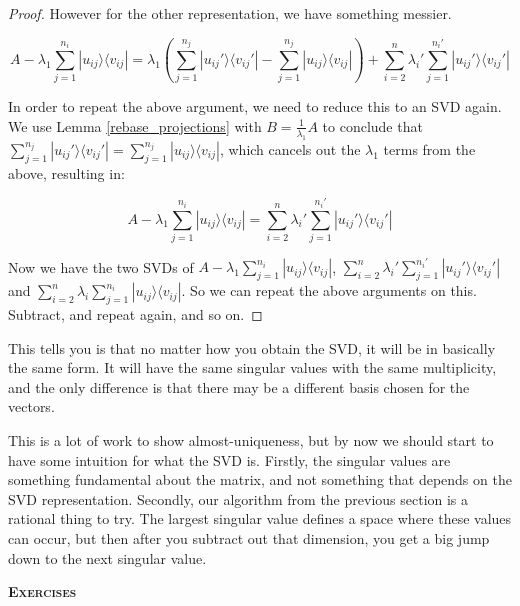 \documentclass{amsbook}
\begin{document}
\begin{proof}
However for the other representation, we have something messier.

$$
A-\lambda_1\sum_{j=1}^{n_i}|u_{ij}\rangle\langle v_{ij}|=\lambda_1\left(\sum_{j=1}^{n_j}|u_{ij}'\rangle\langle v_{ij}'|-\sum_{j=1}^{n_j}|u_{ij}\rangle\langle v_{ij}|\right)+\sum_{i=2}^n\lambda_i'\sum_{j=1}^{n_i'}|u_{ij}'\rangle\langle v_{ij}'|
$$

In order to repeat the above argument, we need to reduce this to an SVD again.  We use Lemma \ref{rebase_projections} with $B=\frac{1}{\lambda_1}A$ to conclude that $\sum_{j=1}^{n_j}|u_{ij}'\rangle\langle v_{ij}'|=\sum_{j=1}^{n_j}|u_{ij}\rangle\langle v_{ij}|$, which cancels out the $\lambda_1$ terms from the above, resulting in:

$$
A-\lambda_1\sum_{j=1}^{n_i}|u_{ij}\rangle\langle v_{ij}|=\sum_{i=2}^n\lambda_i'\sum_{j=1}^{n_i'}|u_{ij}'\rangle\langle v_{ij}'|
$$

Now we have the two SVDs of $A-\lambda_1\sum_{j=1}^{n_i}|u_{ij}\rangle\langle v_{ij}|$, $\sum_{i=2}^n\lambda_i'\sum_{j=1}^{n_i'}|u_{ij}'\rangle\langle v_{ij}'|$ and $\sum_{i=2}^n\lambda_i\sum_{j=1}^{n_i}|u_{ij}\rangle\langle v_{ij}|$.  So we can repeat the above arguments on this.  Subtract, and repeat again, and so on.

\end{proof}

This tells you is that no matter how you obtain the SVD, it will be in basically the same form.  It will have the same singular values with the same multiplicity, and the only difference is that there may be a different basis chosen for the vectors.

This is a lot of work to show almost-uniqueness, but by now we should start to have some intuition for what the SVD is.  Firstly, the singular values are something fundamental about the matrix, and not something that depends on the SVD representation.  Secondly, our algorithm from the previous section is a rational thing to try.  The largest singular value defines a space where these values can occur, but then after you subtract out that dimension, you get a big jump down to the next singular value.

{\bfseries\scshape\Large Exercises}
\end{document}
